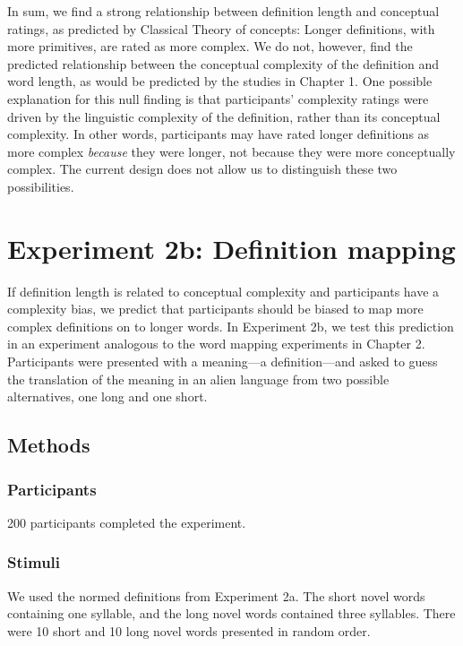In sum, we find a strong relationship between definition length and conceptual ratings, as predicted by Classical Theory of concepts: Longer definitions, with more primitives, are rated as more complex. We do not, however, find the predicted relationship between the conceptual complexity of the definition and word length, as would be predicted by the studies in Chapter 1.  One possible explanation for this null finding is that participants' complexity ratings were driven by the linguistic complexity of the definition, rather than its conceptual complexity. In other words, participants may have  rated longer definitions as more complex {\it because} they were longer, not because they were more conceptually complex. The current design does not allow us to distinguish these two possibilities.

\section{Experiment 2b: Definition mapping}
If definition length is related to conceptual complexity and participants have a complexity bias, we predict that participants should be biased to map more complex definitions on to longer words. In Experiment 2b, we test this prediction in an experiment analogous to the word mapping experiments in Chapter 2. Participants were presented with a meaning---a definition---and asked to guess the translation of the meaning in an alien language from two possible alternatives, one long and one short. 

\subsection{Methods}
\subsubsection{Participants} 
200 participants completed the experiment.
\subsubsection{Stimuli} 
We used the normed definitions from Experiment 2a. The short novel words containing one syllable, and the long novel words contained three syllables. There were 10 short and 10 long novel words presented in random order. 

